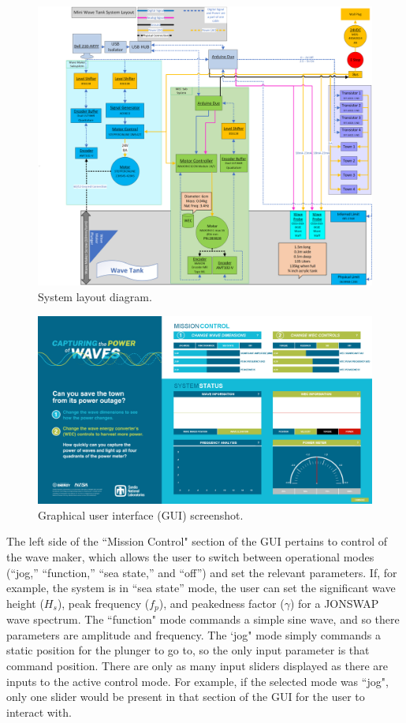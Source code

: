\documentclass[11pt, letterpaper]{article}
\begin{document}
\begin{figure}[tb]
  \centering
  \includegraphics[width=1\textwidth]{diagrams/SystemLayout.png}
  \caption{System layout diagram.}
  \label{fig:siweed_layout}
\end{figure}
\begin{figure}[tb]
  \centering
  \includegraphics[width=1\textwidth]{diagrams/siweed_guiScreenShot.png}
  \caption{Graphical user interface (GUI) screenshot.}
  \label{fig:siweed_guiScreenShot}
\end{figure}

The left side of the ``Mission Control" section of the GUI pertains to control of the wave maker, which allows the user to switch between operational modes (``jog,'' ``function,'' ``sea state,'' and ``off'') and set the relevant parameters.
If, for example, the system is in ``sea state'' mode, the user can set the significant wave height ($H_s$), peak frequency ($f_p$), and peakedness factor ($\gamma$) for a JONSWAP wave spectrum.
The ``function" mode commands a simple sine wave, and so there parameters are amplitude and frequency. 
The `jog" mode simply commands a static position for the plunger to go to, so the only input parameter is that command position. 
There are only as many input sliders displayed as there are inputs to the active control mode. 
For example, if the selected mode was ``jog", only one slider would be present in that section of the GUI for the user to interact with.
\end{document}
